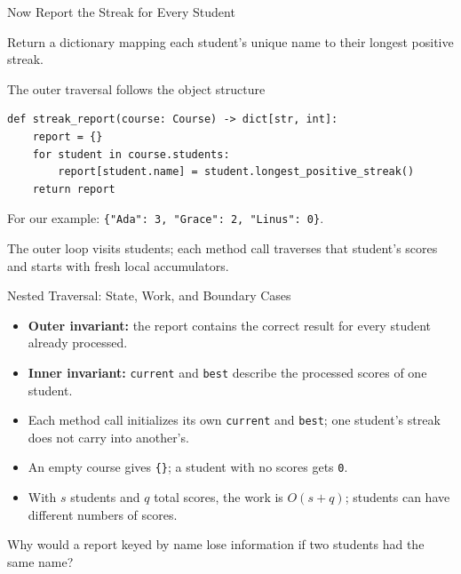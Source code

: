 \documentclass[aspectratio=169,10pt]{beamer}
\begin{document}
\begin{frame}[fragile]{Now Report the Streak for Every Student}
\small
\begin{activity}Return a dictionary mapping each student's unique name to their longest positive streak.\end{activity}
\begin{block}{The outer traversal follows the object structure}
\footnotesize
\begin{verbatim}
def streak_report(course: Course) -> dict[str, int]:
    report = {}
    for student in course.students:
        report[student.name] = student.longest_positive_streak()
    return report
\end{verbatim}
\end{block}
For our example: \texttt{\{"Ada": 3, "Grace": 2, "Linus": 0\}}.
\begin{keyidea}The outer loop visits students; each method call traverses that student's scores and starts with fresh local accumulators.\end{keyidea}
\end{frame}

\begin{frame}{Nested Traversal: State, Work, and Boundary Cases}
\small
\begin{itemize}
 \item \textbf{Outer invariant:} the report contains the correct result for every student already processed.
 \item \textbf{Inner invariant:} \texttt{current} and \texttt{best} describe the processed scores of one student.
 \item Each method call initializes its own \texttt{current} and \texttt{best}; one student's streak does not carry into another's.
 \item An empty course gives \texttt{\{\}}; a student with no scores gets \texttt{0}.
 \item With $s$ students and $q$ total scores, the work is $O(s+q)$; students can have different numbers of scores.
\end{itemize}
\begin{activity}Why would a report keyed by name lose information if two students had the same name?\end{activity}
\end{frame}
\end{document}
